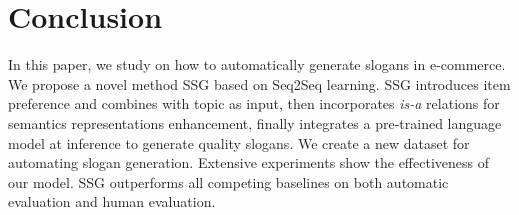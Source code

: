 \section{Conclusion}
\label{sec:conclusion}

In this paper, we study on how to 
automatically generate slogans in e-commerce.
We propose a novel method SSG
based on Seq2Seq learning.
SSG introduces item preference 
and combines with topic as input,
then  incorporates \emph{is-a} relations for semantics representations enhancement,
finally integrates a pre-trained language model at inference 
to generate quality slogans.
We create a new dataset for automating slogan generation.
Extensive experiments show the effectiveness of our model.
SSG outperforms all competing baselines on both automatic evaluation
and human evaluation.

